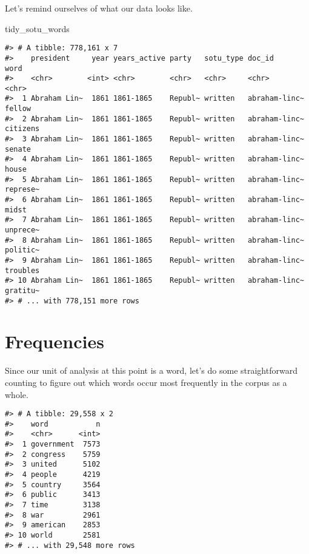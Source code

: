 \documentclass[]{book}
\newenvironment{Shaded}{\begin{snugshade}}{\end{snugshade}}
\newcommand{\DataTypeTok}[1]{\textcolor[rgb]{0.13,0.29,0.53}{#1}}
\newcommand{\KeywordTok}[1]{\textcolor[rgb]{0.13,0.29,0.53}{\textbf{#1}}}
\newcommand{\NormalTok}[1]{#1}
\newcommand{\OperatorTok}[1]{\textcolor[rgb]{0.81,0.36,0.00}{\textbf{#1}}}
\newcommand{\OtherTok}[1]{\textcolor[rgb]{0.56,0.35,0.01}{#1}}
\newcommand{\StringTok}[1]{\textcolor[rgb]{0.31,0.60,0.02}{#1}}
\begin{document}
Let's remind ourselves of what our data looks like.

\begin{Shaded}
\begin{Highlighting}[]
\NormalTok{tidy_sotu_words}
\end{Highlighting}
\end{Shaded}

\begin{verbatim}
#> # A tibble: 778,161 x 7
#>    president     year years_active party   sotu_type doc_id        word    
#>    <chr>        <int> <chr>        <chr>   <chr>     <chr>         <chr>   
#>  1 Abraham Lin~  1861 1861-1865    Republ~ written   abraham-linc~ fellow  
#>  2 Abraham Lin~  1861 1861-1865    Republ~ written   abraham-linc~ citizens
#>  3 Abraham Lin~  1861 1861-1865    Republ~ written   abraham-linc~ senate  
#>  4 Abraham Lin~  1861 1861-1865    Republ~ written   abraham-linc~ house   
#>  5 Abraham Lin~  1861 1861-1865    Republ~ written   abraham-linc~ represe~
#>  6 Abraham Lin~  1861 1861-1865    Republ~ written   abraham-linc~ midst   
#>  7 Abraham Lin~  1861 1861-1865    Republ~ written   abraham-linc~ unprece~
#>  8 Abraham Lin~  1861 1861-1865    Republ~ written   abraham-linc~ politic~
#>  9 Abraham Lin~  1861 1861-1865    Republ~ written   abraham-linc~ troubles
#> 10 Abraham Lin~  1861 1861-1865    Republ~ written   abraham-linc~ gratitu~
#> # ... with 778,151 more rows
\end{verbatim}

\hypertarget{frequencies}{%
\section{Frequencies}\label{frequencies}}

Since our unit of analysis at this point is a word, let's do some straightforward counting to figure out which words occur most frequently in the corpus as a whole.

\begin{Shaded}
\end{Shaded}

\begin{verbatim}
#> # A tibble: 29,558 x 2
#>    word           n
#>    <chr>      <int>
#>  1 government  7573
#>  2 congress    5759
#>  3 united      5102
#>  4 people      4219
#>  5 country     3564
#>  6 public      3413
#>  7 time        3138
#>  8 war         2961
#>  9 american    2853
#> 10 world       2581
#> # ... with 29,548 more rows
\end{verbatim}
\end{document}
